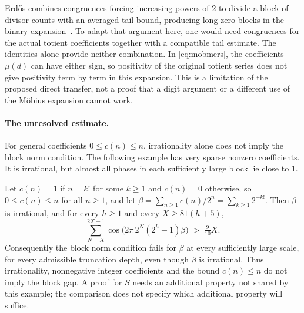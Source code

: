 Erd\H{o}s combines congruences forcing increasing powers of $2$ to divide
a block of divisor counts with an averaged tail bound, producing long
zero blocks in the binary expansion~\cite[pp.~63--66]{erdos1948lambert}.
To adapt that argument here, one would need congruences for the actual
totient coefficients together with a compatible tail estimate. The
identities alone provide neither combination. In \eqref{eq:mobmers},
the coefficients $\mu(d)$ can have either sign, so positivity of the
original totient series does not give positivity term by term in this
expansion. This is a limitation of the proposed direct transfer, not a
proof that a digit argument or a different use of the M\"obius expansion
cannot work.

\paragraph{The unresolved estimate.}
For general coefficients $0\le c(n)\le n$, irrationality alone does not
imply the block norm condition. The following example has very sparse
nonzero coefficients. It is irrational, but almost all phases in each
sufficiently large block lie close to $1$.

\begin{thm}\label{thm:lacunary}
Let $c(n)=1$ if $n=k!$ for some $k\ge 1$ and $c(n)=0$ otherwise, so
$0\le c(n)\le n$ for all $n\ge 1$, and let $\beta=\sum_{n\ge1}c(n)/2^{n}
=\sum_{k\ge 1}2^{-k!}$. Then $\beta$ is irrational, and for every $h\ge 1$
and every $X\ge 81(h+5)$,
\[
  \sum_{N=X}^{2X-1}\cos\bigl(2\pi\,2^{N}(2^{h}-1)\beta\bigr) \;>\; \tfrac{9}{10}X .
\]
Consequently the block norm condition fails for $\beta$ at every
sufficiently large scale, for every admissible truncation depth, even though
$\beta$ is irrational. Thus irrationality, nonnegative integer coefficients
and the bound $c(n)\le n$ do not imply the block gap. A proof for $S$
needs an additional property not shared by this example; the comparison
does not specify which additional property will suffice.
\end{thm}

